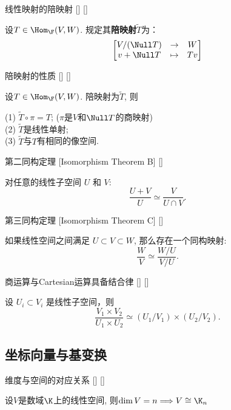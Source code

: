 \documentclass[UTF8]{ctexart}
\begin{document}
		\begin{dfn}
			[]
			{线性映射的陪映射}
			[]
			[]

			设$T\in\Hom_{\F}(V,W)$. 规定其\textbf{陪映射}$\tilde{T}$为：
			\[\begin{bmatrix}
				V/(\Null T)&\to&W\\
				v+\Null T&\mapsto&Tv
			\end{bmatrix}\]
		\end{dfn}

		\begin{ppt}
			[]
			{陪映射的性质}
			[]
			[]

			设$T\in\Hom_{\F}(V,W)$. 陪映射为$\tilde{T}$, 则

			(1) $\tilde{T}\circ\pi=T$; ($\pi$是$V$和$\Null T$的商映射)\\
			(2) $\tilde{T}$是线性单射;\\
			(3) $\tilde{T}$与$T$有相同的像空间.
		\end{ppt}

		\begin{thm}
			[]
			{第二同构定理}
			[Isomorphism Theorem B]
			[]

			对任意的线性子空间 $U$ 和 $V$:
			\[
			\frac{U + V}{U} \simeq \frac{V}{U \cap V}. 
			\]
		\end{thm}
		\begin{thm}
			[]
			{第三同构定理}
			[Isomorphism Theorem C]
			[]

			如果线性空间之间满足 $U \subset V \subset W$, 那么存在一个同构映射:
			\[
			\frac{W}{V} \simeq \frac{W / U}{V / U}.
			\]
		\end{thm}

		\begin{crl}
			[]
			{商运算与Cartesian运算具备结合律}
			[]
			[]

			设 $U_i \subset V_i$ 是线性子空间，则
			\[
			\frac{V_1 \times V_2}{U_1 \times U_2} \simeq (U_1/V_1) \times (U_2/V_2).
			\]
		\end{crl}
        
	
	\subsection{坐标向量与基变换}
		
		\begin{thm}
			[]
			{维度与空间的对应关系}
			[]
			[]

			设$V$是数域$\K$上的线性空间, 则$\dim V=n\Longrightarrow V\cong\K_n$
		\end{thm}
  
\end{document}
